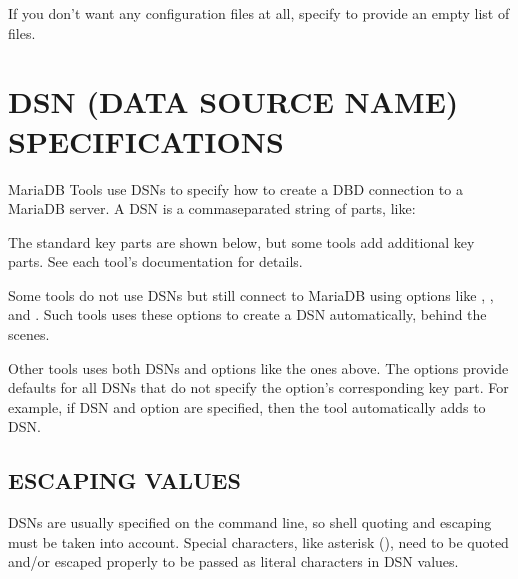 \documentclass[letterpaper,10pt,english]{sphinxmanual}
\begin{document}
\begin{sphinxVerbatim}[commandchars=\\\{\}]
 
\end{sphinxVerbatim}

If you don’t want any configuration files at all, specify  to
provide an empty list of files.


\chapter{DSN (DATA SOURCE NAME) SPECIFICATIONS}
\label{\detokenize{dsn_data_source_name_specifications:dsn-data-source-name-specifications}}\label{\detokenize{dsn_data_source_name_specifications::doc}}
MariaDB Tools use DSNs to specify how to create a DBD connection to
a MariaDB server.  A DSN is a comma\sphinxhyphen{}separated string of  parts, like:

\begin{sphinxVerbatim}[commandchars=\\\{\}]
\end{sphinxVerbatim}

The standard key parts are shown below, but some tools add additional key
parts.  See each tool’s documentation for details.

Some tools do not use DSNs but still connect to MariaDB using options like
, , and .  Such tools uses these options to
create a DSN automatically, behind the scenes.

Other tools uses both DSNs and options like the ones above.  The options
provide defaults for all DSNs that do not specify the option’s corresponding
key part.  For example, if DSN  and option  are
specified, then the tool automatically adds  to DSN.


\section{ESCAPING VALUES}
\label{\detokenize{dsn_data_source_name_specifications:escaping-values}}
DSNs are usually specified on the command line, so shell quoting and escaping
must be taken into account.  Special characters, like asterisk (\sphinxcode{\sphinxupquote{\textbackslash{}*}}), need
to be quoted and/or escaped properly to be passed as literal characters in
DSN values.
\end{document}
